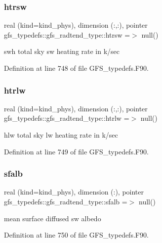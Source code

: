 \subsubsection{htrsw}
{\footnotesize\ttfamily real (kind=kind\+\_\+phys), dimension (\+:,\+:), pointer gfs\+\_\+typedefs\+::gfs\+\_\+radtend\+\_\+type\+::htrsw =$>$ null()}



swh total sky sw heating rate in k/sec 



Definition at line 748 of file G\+F\+S\+\_\+typedefs.\+F90.

\mbox{\label{structgfs__typedefs_1_1gfs__radtend__type_ab7778cd34df6ca871edbbbf4c7773873}} 
\subsubsection{htrlw}
{\footnotesize\ttfamily real (kind=kind\+\_\+phys), dimension (\+:,\+:), pointer gfs\+\_\+typedefs\+::gfs\+\_\+radtend\+\_\+type\+::htrlw =$>$ null()}



hlw total sky lw heating rate in k/sec 



Definition at line 749 of file G\+F\+S\+\_\+typedefs.\+F90.

\mbox{\label{structgfs__typedefs_1_1gfs__radtend__type_ad95defac7b26f67eb71f4c3da5d62be2}} 
\subsubsection{sfalb}
{\footnotesize\ttfamily real (kind=kind\+\_\+phys), dimension (\+:), pointer gfs\+\_\+typedefs\+::gfs\+\_\+radtend\+\_\+type\+::sfalb =$>$ null()}



mean surface diffused sw albedo 



Definition at line 750 of file G\+F\+S\+\_\+typedefs.\+F90.

\mbox{\label{structgfs__typedefs_1_1gfs__radtend__type_a7ef8d4c15a97407ffd7a6f286e0b3d5d}} 
